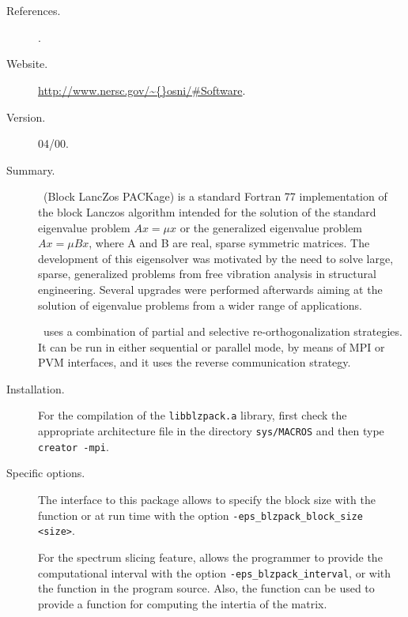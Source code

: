 \section*{\underline{\blzpack}}
	\begin{description}
	\item[References.]\citep{Marques:1995:BDU}.
	\item[Website.] \url{http://www.nersc.gov/\~{}osni/\#Software}.
	\item[Version.] 04/00.
	\item[Summary.] \blzpack\ (Block LancZos PACKage) is a standard Fortran 77 implementation of the block Lanczos algorithm intended for the solution of the standard eigenvalue problem $Ax=\mu x$ or the generalized eigenvalue problem $Ax=\mu Bx$, where A and B are real, sparse symmetric matrices. The development of this eigensolver was motivated by the need to solve large, sparse, generalized problems from free vibration analysis in structural engineering. Several upgrades were performed afterwards aiming at the solution of eigenvalue problems from a wider range of applications.

	\blzpack\ uses a combination of partial and selective re-orthogonalization strategies. It can be run in either sequential or parallel mode, by means of MPI or PVM interfaces, and it uses the reverse communication strategy.
	\item[Installation.] For the compilation of the \texttt{libblzpack.a} library, first check the appropriate architecture file in the directory \texttt{sys/MACROS} and then type \texttt{creator -mpi}.
	\item[Specific options.] The \slepc interface to this package allows
to specify the block size with the function  or
at run time with the option \Verb!-eps_blzpack_block_size <size>!.

	For the spectrum slicing feature, \slepc allows the programmer to provide the computational interval with the option \Verb!-eps_blzpack_interval!, or with the function  in the program source. Also, the function  can be used to provide a function for computing the intertia of the matrix.
	\end{description}

